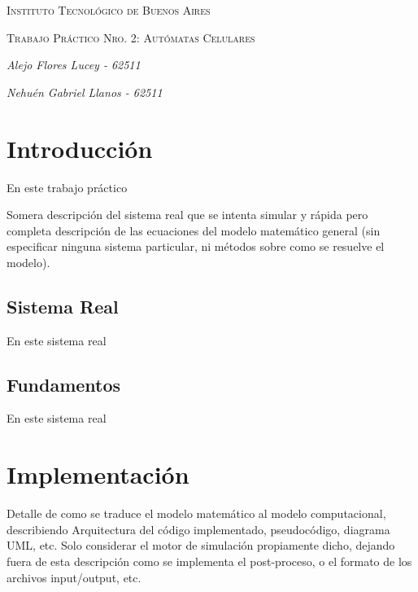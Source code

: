 \documentclass[11pt]{article}
\begin{document}
    \begin{titlepage}
        \centering

        {\scshape\Large Instituto Tecnológico de Buenos Aires \\ \par}
        \vspace{1cm}

        {\scshape\huge Trabajo Práctico Nro. 2: Autómatas Celulares \par}
        \vspace{2cm}

        {\Large\itshape Alejo Flores Lucey - 62511\par}
        {\Large\itshape Nehuén Gabriel Llanos - 62511\par}
        \vfill

    \end{titlepage}

    \section{Introducción}
    En este trabajo práctico

            Somera descripción del sistema
            real que se intenta simular y rápida pero completa descripción de las ecuaciones del modelo
            matemático general (sin especificar ninguna sistema particular, ni métodos sobre como se
            resuelve el modelo).

        \subsection{Sistema Real}
         En este sistema real

        \subsection{Fundamentos}
        En este sistema real

    \newpage

    \section{Implementación}
    Detalle de como se traduce el modelo matemático al modelo computacional,
    describiendo Arquitectura del código implementado, pseudocódigo, diagrama UML, etc.
    Solo considerar el motor de simulación propiamente dicho, dejando fuera de esta descripción
    como se implementa el post-proceso, o el formato de los archivos input/output, etc.
\end{document}
